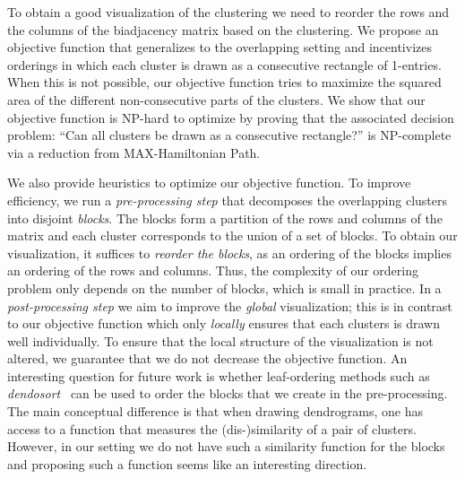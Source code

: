 \documentclass[twoside,leqno,twocolumn]{article}
\theoremstyle{definition}
\begin{document}

To obtain a good visualization of the clustering we need to reorder the rows and the columns of the biadjacency matrix based on the clustering.
We propose an objective function that generalizes to the overlapping setting and incentivizes orderings in which each cluster is drawn as a consecutive rectangle of 1-entries. When this is not possible, our objective function tries to maximize the squared area of the different non-consecutive parts of the clusters. We show that our objective function is NP-hard to optimize by proving that the associated decision problem: ``Can all clusters be drawn as a consecutive rectangle?'' is NP-complete via a reduction from MAX-Hamiltonian Path. %

We also provide heuristics to optimize our objective function. To improve efficiency, we run a \emph{pre-processing step} that decomposes the overlapping clusters into disjoint \emph{blocks}. The blocks form a partition of the rows and columns of the matrix and each cluster corresponds to the union of a set of blocks. To obtain our visualization, it suffices to \emph{reorder the blocks}, as an ordering of the blocks implies an ordering of the rows and columns. Thus, the complexity of our ordering problem only depends on the number of blocks, which is small in practice. %
In a \emph{post-processing step} we aim to improve the \emph{global} visualization; this is in contrast to our objective function which only \emph{locally} ensures that each clusters is drawn well individually. To ensure that the local structure of the visualization is not altered, we guarantee that we do not decrease the objective function.
An interesting question for future work is whether leaf-ordering methods such as \emph{dendosort}~\cite{Dendo} can be used to order the blocks that we create in the pre-processing. The main conceptual difference is that when drawing dendrograms, one has access to a function that measures the (dis-)similarity of a pair of clusters. However, in our setting we do not have such a similarity function for the blocks and proposing such a function seems like an interesting direction.
\end{document}

